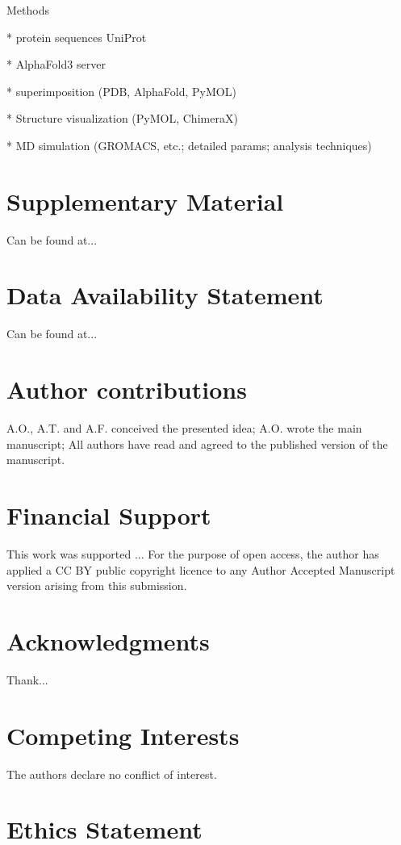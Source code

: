 \documentclass[fleqn,10pt,lineno]{manuscript}
\begin{document}
Methods

* protein sequences UniProt

* AlphaFold3 server

* superimposition (PDB, AlphaFold, PyMOL)

* Structure visualization (PyMOL, ChimeraX)

* MD simulation (GROMACS, etc.; detailed params; analysis techniques)


\section*{Supplementary Material}

Can be found at...


\section*{Data Availability Statement} 

Can be found at...


\section*{Author contributions}

A.O., A.T. and A.F. conceived the presented idea; A.O. wrote the main manuscript; All authors have read and agreed to the published version of the manuscript.


\section*{Financial Support}

This work was supported ... For the purpose of open access, the author has applied a CC BY public copyright licence to any Author Accepted Manuscript version arising from this submission.


\section*{Acknowledgments}

Thank...


\section*{Competing Interests}

The authors declare no conflict of interest.


\section*{Ethics Statement}
\end{document}
